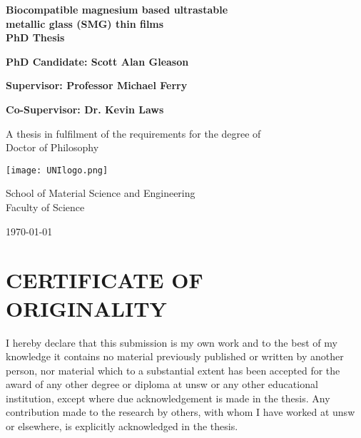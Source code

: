 \documentclass[a4paper,12pt,oneside]{report}%
\begin{document}
\thispagestyle{empty} %
\begin{titlepage}
\begin{center}
\vspace*{1cm}
	
\textbf{\LARGE{Biocompatible magnesium based ultrastable\\ metallic glass (SMG) thin films}}\\
\textbf{PhD Thesis}

\vspace{2cm}

\textbf{\large{PhD Candidate: Scott Alan Gleason}}

\textbf{Supervisor: Professor Michael Ferry}

\textbf{Co-Supervisor: Dr. Kevin Laws}

\vspace{2cm}

A thesis in fulfilment of the requirements for the degree of \\
Doctor of Philosophy

\vspace{1.1cm}

\texttt{[image: UNIlogo.png]}
\label{fig:Unilogo}

\vspace{0.8cm}

School of Material Science and Engineering\\ Faculty of Science

\vspace{2cm}

\today
\end{center}
\end{titlepage}

\clearpage 
{}


\chapter*{CERTIFICATE OF ORIGINALITY}

I hereby declare that this submission is my own work and to the best of my knowledge it
contains no material previously published or written by another person, nor material which
to a substantial extent has been accepted for the award of any other degree or diploma
at \acrshort{unsw} or any other educational institution, except where due acknowledgement is
made in the thesis. Any contribution made to the research by others, with whom I have
worked at \acrshort{unsw} or elsewhere, is explicitly acknowledged in the thesis.
\end{document}
